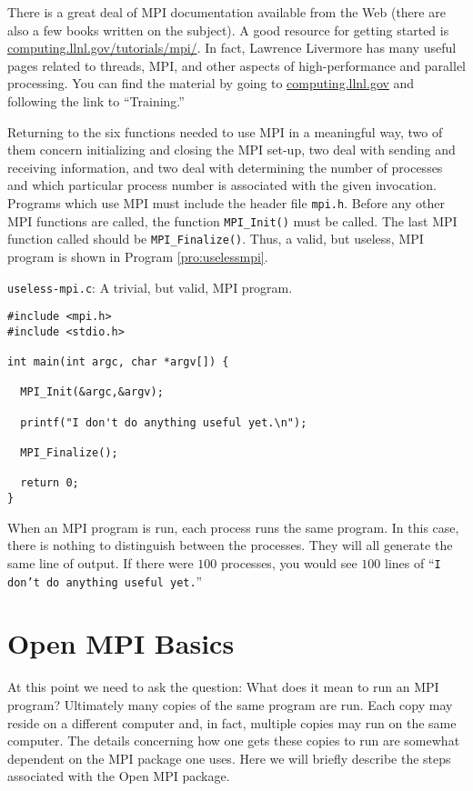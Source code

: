There is a great deal of MPI documentation available from the Web
(there are also a few books written on the subject).  A good resource
for getting started is \url{computing.llnl.gov/tutorials/mpi/}.
In fact, Lawrence Livermore has many useful pages related to threads,
MPI, and other aspects of high-performance and parallel processing.
You can find the material by going to \url{computing.llnl.gov} and
following the link to ``Training.''

Returning to the six functions needed to use MPI in a meaningful way,
two of them concern initializing and closing the MPI set-up, two deal
with sending and receiving information, and two deal with determining
the number of processes and which particular process number is
associated with the given invocation.  Programs which use MPI must
include the header file {\tt mpi.h}.  Before any other MPI functions
are called, the function {\tt MPI\_Init()} must be called.  The last
MPI function called should be {\tt MPI\_Finalize()}.  Thus, a valid,
but useless, MPI program is shown in Program \ref{pro:uselessmpi}.

\begin{program}
{\tt useless-mpi.c}: A trivial, but valid, MPI
program. \label{pro:uselessmpi} 
\codemiddle
\begin{lstlisting}
#include <mpi.h>
#include <stdio.h>

int main(int argc, char *argv[]) {

  MPI_Init(&argc,&argv);

  printf("I don't do anything useful yet.\n");

  MPI_Finalize();

  return 0;
}
\end{lstlisting}
\end{program}

When an MPI program is run, each process runs the same program.  In
this case, there is nothing to distinguish between the processes.
They will all generate the same line of output.  If there were $100$
processes, you would see $100$ lines of ``{\tt I don't do anything
useful yet.}''

\section{Open MPI Basics}

At this point we need to ask the question: What does it mean to run an
MPI program?  Ultimately many copies of the same program are run.
Each copy may reside on a different computer and, in fact, multiple
copies may run on the same computer.  The details concerning how one
gets these copies to run are somewhat dependent on the MPI package one
uses.  Here we will briefly describe the steps associated with the
Open MPI package.

